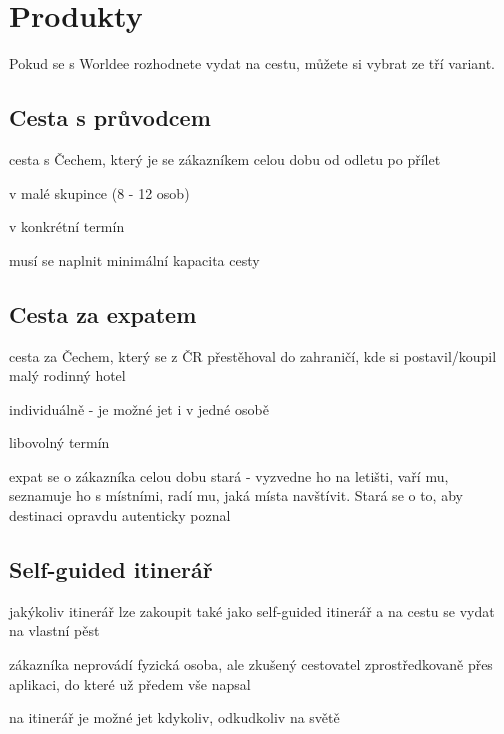 \section{Produkty}

Pokud se s Worldee rozhodnete vydat na cestu, můžete si vybrat ze tří variant.\cite{Worldee}

\subsection*{Cesta s průvodcem}
    \begin{shortitemize}
        \item cesta s Čechem, který je se zákazníkem celou dobu od odletu po přílet
        \item v malé skupince (8 - 12 osob)
        \item v konkrétní termín
        \item musí se naplnit minimální kapacita cesty
    \end{shortitemize}
\subsection*{Cesta za expatem}
    \begin{shortitemize}
        \item cesta za Čechem, který se z ČR přestěhoval do zahraničí, kde si postavil/koupil malý rodinný hotel
        \item individuálně - je možné jet i v jedné osobě
        \item libovolný termín
        \item expat se o zákazníka celou dobu stará - vyzvedne ho na letišti, vaří mu, seznamuje ho s místními, radí mu, jaká místa navštívit. Stará se o to, aby destinaci opravdu autenticky poznal
    \end{shortitemize}
\subsection*{Self-guided itinerář}
    \begin{shortitemize}
        \item jakýkoliv itinerář lze zakoupit také jako self-guided itinerář a na cestu se vydat na vlastní pěst
        \item zákazníka neprovádí fyzická osoba, ale zkušený cestovatel zprostředkovaně přes aplikaci, do které už předem vše napsal
        \item na itinerář je možné jet kdykoliv, odkudkoliv na světě
    \end{shortitemize}